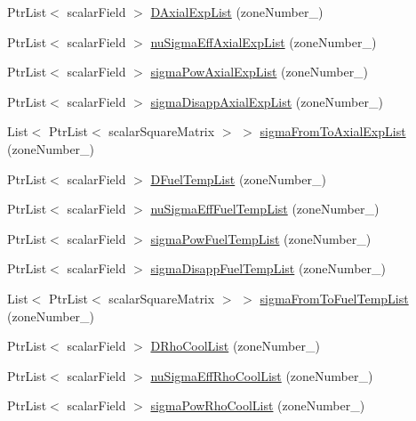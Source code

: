 \begin{DoxyCompactItemize}
\item 
Ptr\+List$<$ scalar\+Field $>$ \hyperlink{readNuclearDataLowMem_8H_a81cc11116f227693480b0fb15230836e}{D\+Axial\+Exp\+List} (zone\+Number\+\_\+)
\item 
Ptr\+List$<$ scalar\+Field $>$ \hyperlink{readNuclearDataLowMem_8H_a8023ea049e0382517d5eadb06b9aba84}{nu\+Sigma\+Eff\+Axial\+Exp\+List} (zone\+Number\+\_\+)
\item 
Ptr\+List$<$ scalar\+Field $>$ \hyperlink{readNuclearDataLowMem_8H_a48a08cc967cf6bde7bf51693cfa0c509}{sigma\+Pow\+Axial\+Exp\+List} (zone\+Number\+\_\+)
\item 
Ptr\+List$<$ scalar\+Field $>$ \hyperlink{readNuclearDataLowMem_8H_ad0a2d82c535bddd6a26430df9162b0a2}{sigma\+Disapp\+Axial\+Exp\+List} (zone\+Number\+\_\+)
\item 
List$<$ Ptr\+List$<$ scalar\+Square\+Matrix $>$ $>$ \hyperlink{readNuclearDataLowMem_8H_ae3b66677b938cea91100197a993c0be5}{sigma\+From\+To\+Axial\+Exp\+List} (zone\+Number\+\_\+)
\item 
Ptr\+List$<$ scalar\+Field $>$ \hyperlink{readNuclearDataLowMem_8H_a6978e2b2f5467a87966d45cbf0c4c639}{D\+Fuel\+Temp\+List} (zone\+Number\+\_\+)
\item 
Ptr\+List$<$ scalar\+Field $>$ \hyperlink{readNuclearDataLowMem_8H_a809ec1538e95a1b3138e0f7ac7abeb6c}{nu\+Sigma\+Eff\+Fuel\+Temp\+List} (zone\+Number\+\_\+)
\item 
Ptr\+List$<$ scalar\+Field $>$ \hyperlink{readNuclearDataLowMem_8H_a88e8c2024bcad8a75bc4741e435662d3}{sigma\+Pow\+Fuel\+Temp\+List} (zone\+Number\+\_\+)
\item 
Ptr\+List$<$ scalar\+Field $>$ \hyperlink{readNuclearDataLowMem_8H_a8570c829c55376df41f67a186ec91bf0}{sigma\+Disapp\+Fuel\+Temp\+List} (zone\+Number\+\_\+)
\item 
List$<$ Ptr\+List$<$ scalar\+Square\+Matrix $>$ $>$ \hyperlink{readNuclearDataLowMem_8H_a7a512ab1139eb59d9a462aff49587bd0}{sigma\+From\+To\+Fuel\+Temp\+List} (zone\+Number\+\_\+)
\item 
Ptr\+List$<$ scalar\+Field $>$ \hyperlink{readNuclearDataLowMem_8H_a80c69533a883cb75133bf44d1ab082fe}{D\+Rho\+Cool\+List} (zone\+Number\+\_\+)
\item 
Ptr\+List$<$ scalar\+Field $>$ \hyperlink{readNuclearDataLowMem_8H_ace6a4873e7010cc1830544f8d535616b}{nu\+Sigma\+Eff\+Rho\+Cool\+List} (zone\+Number\+\_\+)
\item 
Ptr\+List$<$ scalar\+Field $>$ \hyperlink{readNuclearDataLowMem_8H_a33da238d86d5b52bcf74e78b450715f7}{sigma\+Pow\+Rho\+Cool\+List} (zone\+Number\+\_\+)

\end{DoxyCompactItemize}
